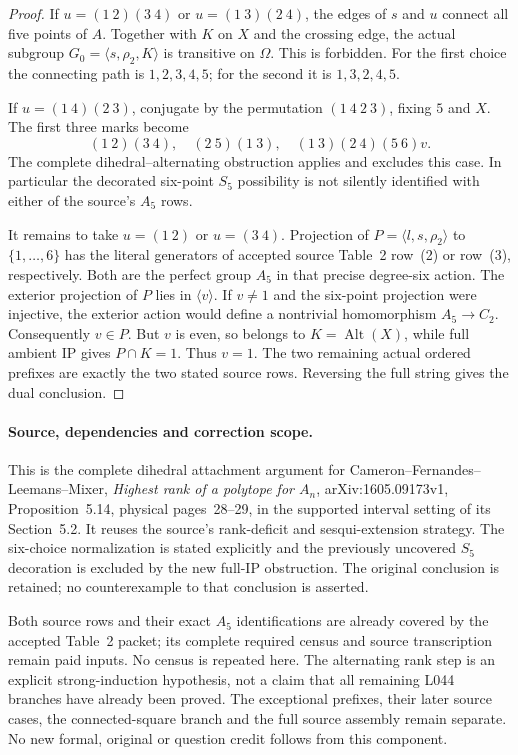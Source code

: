 \documentclass[11pt,a4paper]{article}
\newcommand{\gen}[1]{\langle#1\rangle}
\newcommand{\Alt}{\operatorname{Alt}}
\begin{document}
\begin{proof}
If $u=(1\ 2)(3\ 4)$ or $u=(1\ 3)(2\ 4)$, the edges of
$s$ and $u$ connect all five points of $A$. Together with
$K$ on $X$ and the crossing edge, the actual subgroup
$G_0=\gen{s,\rho_2,K}$ is transitive on $\Omega$.
This is forbidden. For the first choice the connecting path
is $1,2,3,4,5$; for the second it is $1,3,2,4,5$.

If $u=(1\ 4)(2\ 3)$, conjugate by the permutation
$(1\ 4\ 2\ 3)$, fixing $5$ and $X$. The first three
marks become
\[
 (1\ 2)(3\ 4),\quad(2\ 5)(1\ 3),\quad
 (1\ 3)(2\ 4)(5\ 6)v.
\]
The complete dihedral--alternating obstruction applies and
excludes this case. In particular the decorated six-point
$S_5$ possibility is not silently identified with either
of the source's $A_5$ rows.

It remains to take $u=(1\ 2)$ or $u=(3\ 4)$.
Projection of $P=\gen{l,s,\rho_2}$ to $\{1,\ldots,6\}$
has the literal generators of accepted source Table~2
row~(2) or row~(3), respectively. Both are the perfect
group $A_5$ in that precise degree-six action. The exterior
projection of $P$ lies in $\gen v$. If $v\ne1$ and the
six-point projection were injective, the exterior action
would define a nontrivial homomorphism $A_5\to C_2$.
Consequently $v\in P$. But $v$ is even, so belongs to
$K=\Alt(X)$, while full ambient IP gives $P\cap K=1$.
Thus $v=1$. The two remaining actual ordered prefixes are
exactly the two stated source rows. Reversing the full
string gives the dual conclusion.
\end{proof}

\paragraph{Source, dependencies and correction scope.}
This is the complete dihedral attachment argument for
Cameron--Fernandes--Leemans--Mixer, \emph{Highest rank of
a polytope for $A_n$}, arXiv:1605.09173v1,
Proposition~5.14, physical pages~28--29, in the supported
interval setting of its Section~5.2. It reuses the source's
rank-deficit and sesqui-extension strategy. The six-choice
normalization is stated explicitly and the previously
uncovered $S_5$ decoration is excluded by the new full-IP
obstruction. The original conclusion is retained; no
counterexample to that conclusion is asserted.

Both source rows and their exact $A_5$ identifications are
already covered by the accepted Table~2 packet; its complete
required census and source transcription remain paid
inputs. No census is repeated here. The alternating rank
step is an explicit strong-induction hypothesis, not a claim
that all remaining L044 branches have already been proved.
The exceptional prefixes, their later source cases, the
connected-square branch and the full source assembly remain
separate. No new formal, original or question credit follows
from this component.
\end{document}
